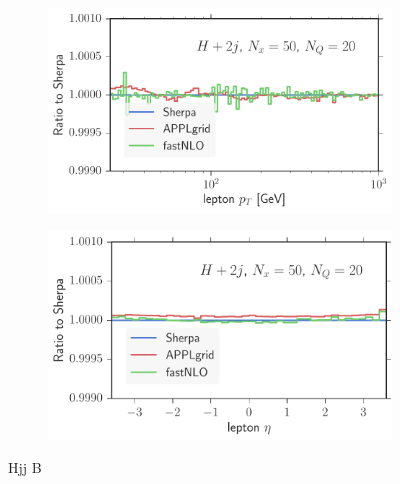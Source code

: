 \begin{figure}
\begin{subfigure}[]{0.49\textwidth}
	\includegraphics[width=\textwidth]{images/hjjb_lpt.pdf}
\end{subfigure}
\begin{subfigure}[]{0.49\textwidth}
	\includegraphics[width=\textwidth]{images/hjjb_leta.pdf}
\end{subfigure}
\caption{Hjj B}
\end{figure}
%
